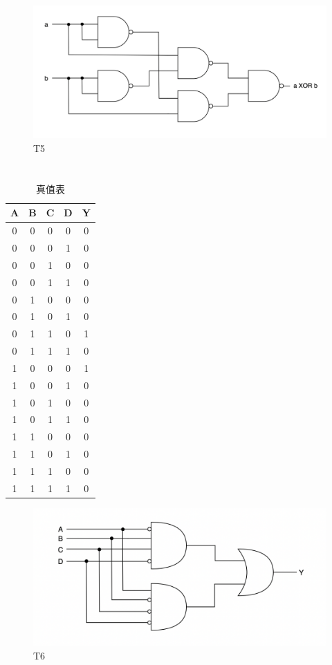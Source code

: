 \documentclass[UTF8]{ctexart}
\begin{document}
\section{}  %
\begin{figure}[h]
  \centering
  \includegraphics[scale=0.3]{p4.png}
  \caption{T5}
\end{figure}
\section{}  %
\begin{table}[H]\centering
  \setlength{\tabcolsep}{8mm}
  \begin{tabular}{cccc|c}
    \hline\hline
    A & B & C & D & Y\\
    \hline
    0 & 0 & 0 & 0 & 0 \\
    0 & 0 & 0 & 1 & 0 \\
    0 & 0 & 1 & 0 & 0 \\
    0 & 0 & 1 & 1 & 0 \\
    0 & 1 & 0 & 0 & 0 \\
    0 & 1 & 0 & 1 & 0 \\
    0 & 1 & 1 & 0 & 1 \\
    0 & 1 & 1 & 1 & 0 \\
    1 & 0 & 0 & 0 & 1 \\
    1 & 0 & 0 & 1 & 0 \\
    1 & 0 & 1 & 0 & 0 \\
    1 & 0 & 1 & 1 & 0 \\
    1 & 1 & 0 & 0 & 0 \\
    1 & 1 & 0 & 1 & 0 \\
    1 & 1 & 1 & 0 & 0 \\
    1 & 1 & 1 & 1 & 0 \\
    \hline\hline
  \end{tabular}
  \caption{真值表}
\end{table}
\begin{figure}[h]
  \centering
  \includegraphics[scale=0.3]{p3.png}
  \caption{T6}
\end{figure}
\clearpage
\end{document}
